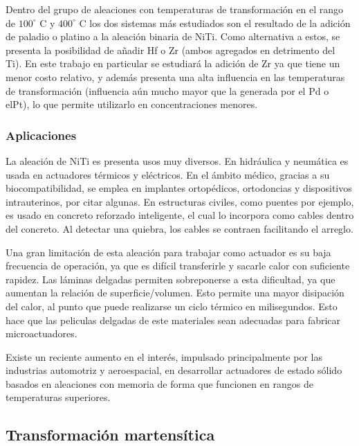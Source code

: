 \documentclass{article}
\theoremstyle{definition}
\theoremstyle{remark}
\begin{document}
Dentro del grupo de aleaciones con temperaturas de transformación en el rango de $100^\circ$ C y $400^\circ$ C los dos sistemas más estudiados son el resultado de la adición de paladio o platino a la aleación binaria de NiTi. Como alternativa a estos, se presenta la posibilidad de añadir Hf o Zr (ambos agregados en detrimento del Ti)\cite{HTSMA}. En este trabajo en particular se estudiará la adición de Zr ya que tiene un menor costo relativo, y además presenta una alta influencia en las temperaturas de transformación (influencia aún mucho mayor que la generada por el Pd o elPt), lo que permite utilizarlo en concentraciones menores\citep{HTSMA}.

\subsubsection{Aplicaciones}
La aleación de NiTi es presenta usos muy diversos. En hidráulica y neumática es usada en actuadores térmicos y eléctricos. En el ámbito médico, gracias a su biocompatibilidad, se emplea en implantes ortopédicos, ortodoncias y dispositivos intrauterinos, por citar algunas. En estructuras civiles, como puentes por ejemplo, es usado en concreto reforzado inteligente, el cual lo incorpora como cables dentro del concreto. Al detectar una quiebra, los cables se contraen facilitando el arreglo\cite{Engineering}.

Una gran limitación de esta aleación para trabajar como actuador es su baja frecuencia de operación, ya que es difícil transferirle y sacarle calor con suficiente rapidez. Las láminas delgadas permiten sobreponerse a esta dificultad, ya que aumentan la relación de superficie/volumen. Esto permite una mayor disipación del calor, al punto que puede realizarse un ciclo térmico en milisegundos. Esto hace que las peliculas delgadas de este materiales sean adecuadas para fabricar microactuadores\citep{ThinFilm}.

Existe un reciente aumento en el interés, impulsado principalmente por las industrias automotriz y aeroespacial, en desarrollar actuadores de estado sólido basados en aleaciones con memoria de forma que funcionen en rangos de temperaturas superiores.
\subsection{Transformación martensítica}
\end{document}
